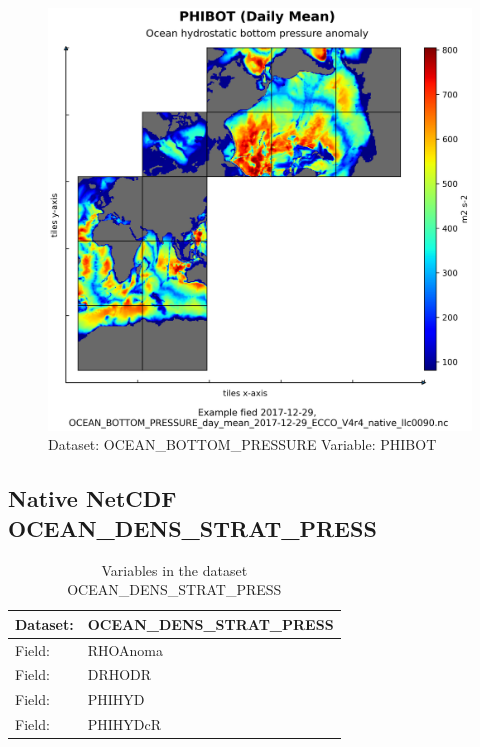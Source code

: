 \begin{figure}[H]
\centering
\includegraphics[width=\textwidth]{../images/plots/native_plots/Ocean_Bottom_Pressure/PHIBOT.png}
\caption{Dataset: OCEAN\_BOTTOM\_PRESSURE Variable: PHIBOT}
\label{tab:table-OCEAN_BOTTOM_PRESSURE_PHIBOT-Plot}
\end{figure}
\pagebreak
\subsection{Native NetCDF OCEAN\_DENS\_STRAT\_PRESS}
\newp
\begin{longtable}{|p{}|p{}|}
\caption{Variables in the dataset OCEAN\_DENS\_STRAT\_PRESS}
\label{tab:table-OCEAN_DENS_STRAT_PRESS-fields} \\ 
\hline \endhead \hline \endfoot
\rowcolor{lightgray} \textbf{Dataset:} & \textbf{OCEAN\_DENS\_STRAT\_PRESS} \\ \hline
Field: &RHOAnoma \\ \hline
Field: &DRHODR \\ \hline
Field: &PHIHYD \\ \hline
Field: &PHIHYDcR \\ \hline
\end{longtable}

\pagebreak

